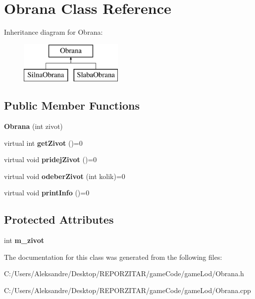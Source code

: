 \hypertarget{class_obrana}{}\section{Obrana Class Reference}
\label{class_obrana}
Inheritance diagram for Obrana\+:\begin{figure}[H]
\begin{center}
\leavevmode
\includegraphics[height=2.000000cm]{class_obrana}
\end{center}
\end{figure}
\subsection*{Public Member Functions}
\begin{DoxyCompactItemize}
\item 
\mbox{\label{class_obrana_a8f22b1fbccdd40b2f2b6dfd37b941203}} 
{\bfseries Obrana} (int zivot)
\item 
\mbox{\label{class_obrana_a0850383cf46b2bbb753fa698482cc893}} 
virtual int {\bfseries get\+Zivot} ()=0
\item 
\mbox{\label{class_obrana_ac7c0af7664119702a6228c2375ada964}} 
virtual void {\bfseries pridej\+Zivot} ()=0
\item 
\mbox{\label{class_obrana_a605003c1b1ce9a792ddbd781284542f4}} 
virtual void {\bfseries odeber\+Zivot} (int kolik)=0
\item 
\mbox{\label{class_obrana_aa951ee2fc287e633ec47e3df50d60f43}} 
virtual void {\bfseries print\+Info} ()=0
\end{DoxyCompactItemize}
\subsection*{Protected Attributes}
\begin{DoxyCompactItemize}
\item 
\mbox{\label{class_obrana_ab448db043456875d9879338223a4e54a}} 
int {\bfseries m\+\_\+zivot}
\end{DoxyCompactItemize}


The documentation for this class was generated from the following files\+:\begin{DoxyCompactItemize}
\item 
C\+:/\+Users/\+Aleksandre/\+Desktop/\+R\+E\+P\+O\+R\+Z\+I\+T\+A\+R/game\+Code/game\+Lod/Obrana.\+h\item 
C\+:/\+Users/\+Aleksandre/\+Desktop/\+R\+E\+P\+O\+R\+Z\+I\+T\+A\+R/game\+Code/game\+Lod/Obrana.\+cpp\end{DoxyCompactItemize}
